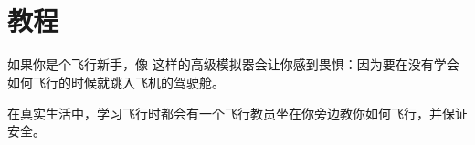 
\ifchinese
\chapter{{\\}教程}
\fi
\iffalse
\IfLanguageName{english}{
\chapter{Tutorials}
}{}
\fi
{}
\label{tutorials}

\ifchinese
如果你是个飞行新手，像 \FlightGear{} 这样的高级模拟器会让你感到畏惧：因为要在没有学会如何飞行的时候就跳入飞机的驾驶舱。

在真实生活中，学习飞行时都会有一个飞行教员坐在你旁边教你如何飞行，并保证安全。

